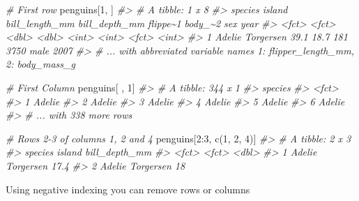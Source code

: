 \documentclass[
  12pt,
]{book}
\newenvironment{Shaded}{\begin{snugshade}}{\end{snugshade}}
\newcommand{\CommentTok}[1]{\textcolor[rgb]{0.56,0.35,0.01}{\textit{#1}}}
\newcommand{\DecValTok}[1]{\textcolor[rgb]{0.00,0.00,0.81}{#1}}
\newcommand{\FunctionTok}[1]{\textcolor[rgb]{0.00,0.00,0.00}{#1}}
\newcommand{\NormalTok}[1]{#1}
\newcommand{\SpecialCharTok}[1]{\textcolor[rgb]{0.00,0.00,0.00}{#1}}
\begin{document}
\begin{Shaded}
\begin{Highlighting}[]
\CommentTok{\# First row}
\NormalTok{penguins[}\DecValTok{1}\NormalTok{, ]}
\CommentTok{\#\textgreater{} \# A tibble: 1 x 8}
\CommentTok{\#\textgreater{}   species island    bill\_length\_mm bill\_depth\_mm flippe\textasciitilde{}1 body\_\textasciitilde{}2 sex    year}
\CommentTok{\#\textgreater{}   \textless{}fct\textgreater{}   \textless{}fct\textgreater{}              \textless{}dbl\textgreater{}         \textless{}dbl\textgreater{}    \textless{}int\textgreater{}   \textless{}int\textgreater{} \textless{}fct\textgreater{} \textless{}int\textgreater{}}
\CommentTok{\#\textgreater{} 1 Adelie  Torgersen           39.1          18.7      181    3750 male   2007}
\CommentTok{\#\textgreater{} \# ... with abbreviated variable names 1: flipper\_length\_mm, 2: body\_mass\_g}

\CommentTok{\# First Column }
\NormalTok{penguins[ , }\DecValTok{1}\NormalTok{]}
\CommentTok{\#\textgreater{} \# A tibble: 344 x 1}
\CommentTok{\#\textgreater{}   species}
\CommentTok{\#\textgreater{}   \textless{}fct\textgreater{}  }
\CommentTok{\#\textgreater{} 1 Adelie }
\CommentTok{\#\textgreater{} 2 Adelie }
\CommentTok{\#\textgreater{} 3 Adelie }
\CommentTok{\#\textgreater{} 4 Adelie }
\CommentTok{\#\textgreater{} 5 Adelie }
\CommentTok{\#\textgreater{} 6 Adelie }
\CommentTok{\#\textgreater{} \# ... with 338 more rows}

\CommentTok{\# Rows 2{-}3 of columns 1, 2 and 4}
\NormalTok{penguins[}\DecValTok{2}\SpecialCharTok{:}\DecValTok{3}\NormalTok{, }\FunctionTok{c}\NormalTok{(}\DecValTok{1}\NormalTok{, }\DecValTok{2}\NormalTok{, }\DecValTok{4}\NormalTok{)]}
\CommentTok{\#\textgreater{} \# A tibble: 2 x 3}
\CommentTok{\#\textgreater{}   species island    bill\_depth\_mm}
\CommentTok{\#\textgreater{}   \textless{}fct\textgreater{}   \textless{}fct\textgreater{}             \textless{}dbl\textgreater{}}
\CommentTok{\#\textgreater{} 1 Adelie  Torgersen          17.4}
\CommentTok{\#\textgreater{} 2 Adelie  Torgersen          18}
\end{Highlighting}
\end{Shaded}

Using negative indexing you can remove rows or columns
\end{document}
